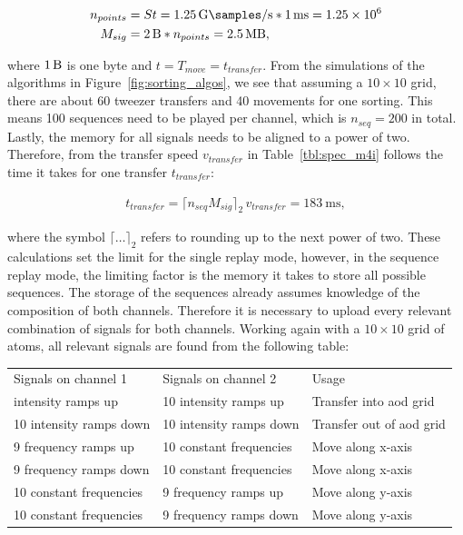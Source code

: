 \begin{align}
	n_{points} &= S t = \SI{1.25}{\giga\samples\per\second} * \SI{1}{\milli\second} = \num{1.25e6} \\
	M_{sig} &= \SI{2}{\byte} * n_{points} = \SI{2.5}{\mega\byte},
\end{align}

where $\SI{1}{\byte}$ is one byte and $t=T_{move}=t_{transfer}$. From the simulations of the algorithms in Figure~\ref{fig:sorting_algos}, we see that assuming a $10\times10$ grid, there are about 60 tweezer transfers and 40 movements for one sorting. This means 100 sequences need to be played per channel, which is $n_{seq}=200$ in total. Lastly, the memory for all signals needs to be aligned to a power of two. Therefore, from the transfer speed $v_{transfer}$ in Table~\ref{tbl:spec_m4i} follows the time it takes for one transfer $t_{transfer}$:

\begin{align}
	t_{transfer} = \lceil n_{seq} M_{sig}\rceil_2\, v_{transfer} = \SI{183}{\milli\second},
\end{align}

where the symbol $\lceil \ldots \rceil_2$ refers to rounding up to the next power of two.
These calculations set the limit for the single replay mode, however, in the sequence replay mode, the limiting factor is the memory it takes to store all possible sequences. The storage of the sequences already assumes knowledge of the composition of both channels. Therefore it is necessary to upload every relevant combination of signals for both channels. Working again with a $10\times10$ grid of atoms, all relevant signals are found from the following table:

\begin{center}
\begin{tabular}{l l l}
	\toprule \toprule
		Signals on channel 1 & Signals on channel 2 & Usage \\ \thickhline%
		10 intensity ramps up & 10 intensity ramps up & Transfer into \ac{aod} grid \\
		10 intensity ramps down & 10 intensity ramps down & Transfer out of \ac{aod} grid \\
		9 frequency ramps up & 10 constant frequencies & Move along x-axis \\
		9 frequency ramps down & 10 constant frequencies & Move along x-axis \\
		10 constant frequencies & 9 frequency ramps up & Move along y-axis \\
		10 constant frequencies & 9 frequency ramps down & Move along y-axis \\
	\bottomrule \bottomrule
\end{tabular}
\end{center}

